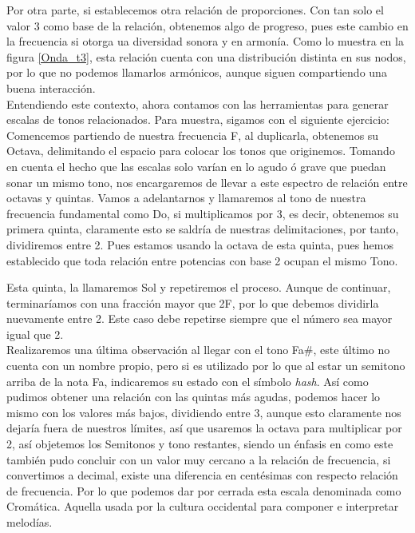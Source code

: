 \documentclass{book}
\begin{document}
	Por otra parte, si establecemos otra relación de proporciones. Con tan solo el valor 3 como base de la relación, obtenemos algo de progreso, pues este cambio en la frecuencia si otorga ua diversidad sonora y en armonía. Como lo muestra en la figura \ref{Onda_t3}, esta relación cuenta con una distribución distinta en sus nodos, por lo que no podemos llamarlos armónicos, aunque siguen compartiendo una buena interacción.\\ 
	Entendiendo este contexto, ahora contamos con las herramientas para generar escalas de tonos relacionados. Para muestra, sigamos con el siguiente ejercicio: \\
	Comencemos partiendo de nuestra frecuencia F, al duplicarla, obtenemos su Octava, delimitando el espacio para colocar los tonos que originemos. Tomando en cuenta el hecho que las escalas solo varían en lo agudo ó grave que puedan sonar un mismo tono, nos encargaremos de llevar a este espectro de relación entre octavas y quintas. Vamos a adelantarnos y llamaremos al tono de nuestra frecuencia fundamental como Do, si multiplicamos por 3, es decir, obtenemos su primera quinta, claramente esto se saldría de nuestras delimitaciones, por tanto, dividiremos entre 2. Pues estamos usando la octava de esta quinta, pues hemos establecido que toda relación entre potencias con base 2 ocupan el mismo Tono.\par
	Esta quinta, la llamaremos Sol y repetiremos el proceso. Aunque de continuar, terminaríamos con una fracción mayor que 2F, por lo que debemos dividirla nuevamente entre 2. Este caso debe repetirse siempre que el número sea mayor igual que 2.\\
	Realizaremos una última observación al llegar con el tono Fa\#, este último no cuenta con un nombre propio, pero si es utilizado por lo que al estar un semitono arriba de la nota Fa, indicaremos su estado con el símbolo \emph{hash}.\pagebreak
	Así como pudimos obtener una relación con las quintas más agudas, podemos hacer lo mismo con los valores más bajos, dividiendo entre 3, aunque esto claramente nos dejaría fuera de nuestros límites, así que usaremos la octava para multiplicar por 2, así objetemos los Semitonos y tono restantes, siendo un énfasis en como este también pudo concluir con un valor muy cercano a la relación de frecuencia, si convertimos a decimal, existe una diferencia en centésimas con respecto relación de frecuencia. Por lo que podemos dar por cerrada esta escala denominada como Cromática. Aquella usada por la cultura occidental para componer e interpretar melodías.\par
\end{document}

